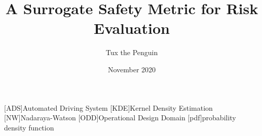 \documentclass{article}
\title{A Surrogate Safety Metric for Risk Evaluation}
\author{Tux the Penguin}
\date{November 2020}
\begin{document}
\begin{acronym}[AAAAAAAA]
	[ADS]{Automated Driving System}
	[KDE]{Kernel Density Estimation}
	[NW]{Nadaraya-Watson}
	[ODD]{Operational Design Domain}
	[pdf]{probability density function}
\end{acronym}

\maketitle











\printbibliography
\end{document}
